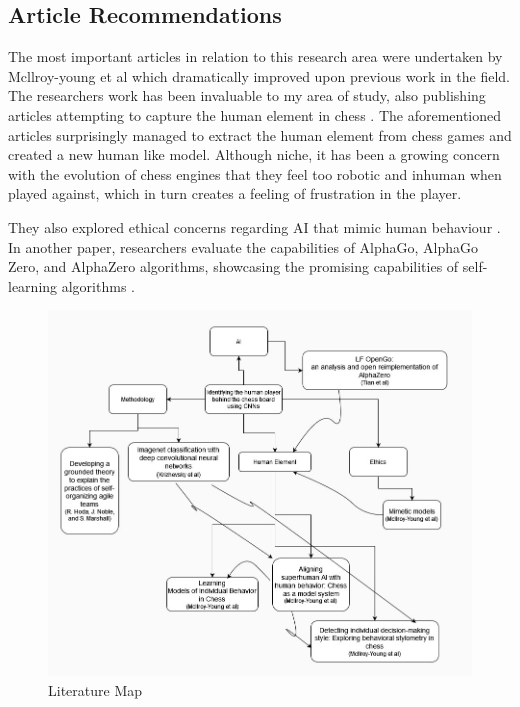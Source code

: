 \begin{spacing}{2.0}
\subsection{Article Recommendations}

The most important articles in relation to this research area were undertaken by Mcllroy-young et al\cite{stylometryChess} which dramatically improved upon previous work in the field. The researchers work has been invaluable to my area of study, also publishing articles attempting to capture the human element in chess \cite{SuperAI}\cite{McIlroyYoung_Learning_Models_Chess_2022}. The aforementioned articles surprisingly managed to extract the human element from chess games and created a new human like model. Although niche, it has been a growing concern with the evolution of chess engines that they feel too robotic and inhuman when played against,
which in turn creates a feeling of frustration in the player.

They also explored ethical concerns regarding AI that mimic human behaviour \cite{mimicAI}. In another paper, researchers evaluate the capabilities of AlphaGo, AlphaGo Zero, and AlphaZero algorithms, showcasing the promising capabilities of self-learning algorithms \cite{alphazero}.

\begin{figure}[ht]
\centering
\includegraphics[scale=0.3]{Figures/LiteratureMap.jpg}
\caption{Literature Map}
\label{fig:LitMap} 
\end{figure}


\end{spacing}
